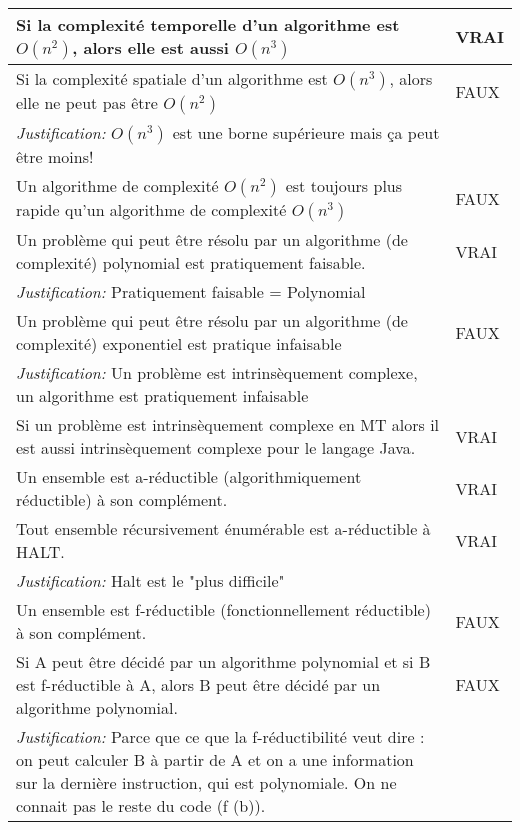\begin{longtable}{p{13cm}|l}
    Si la complexité temporelle d'un algorithme est $O(n^{2})$, alors elle est aussi $O(n^{3})$ & VRAI \\
    \hline
    Si la complexité spatiale d'un algorithme est $O(n^{3})$, alors elle ne peut pas être $O(n^{2})$  & FAUX \\
 	    \textit{Justification:} $O(n^{3})$ est une borne supérieure mais ça peut être moins!   \\
    \hline
    Un algorithme de complexité $O(n^{2})$ est toujours plus rapide qu'un algorithme de complexité $O(n^{3})$ & FAUX \\
    \hline
    Un problème qui peut être résolu par un algorithme (de complexité) polynomial est pratiquement faisable. & VRAI \\
        \textit{Justification:} Pratiquement faisable = Polynomial \\
    \hline
    Un problème qui peut être résolu par un algorithme (de complexité) exponentiel est pratique infaisable & FAUX \\
       \textit{Justification:} Un problème est intrinsèquement complexe, un algorithme est pratiquement infaisable \\
    \hline
    Si un problème est intrinsèquement complexe en MT alors il est aussi intrinsèquement complexe pour le langage Java.& VRAI\\
    \hline
    Un ensemble est a-réductible (algorithmiquement réductible) à son complément.& VRAI\\
    \hline
    Tout ensemble récursivement énumérable est a-réductible à HALT. & VRAI\\
      \textit{Justification:} Halt est le "plus difficile" \\
    \hline
    Un ensemble est f-réductible (fonctionnellement réductible) à son complément. & FAUX \\
    \hline
    Si A peut être décidé par un algorithme polynomial et si B est f-réductible à A, alors B peut être décidé par un algorithme polynomial. & FAUX \\
    \textit{Justification:} Parce que ce que la f-réductibilité veut dire : on peut calculer B à partir de A et on a une information sur la dernière instruction, qui est polynomiale. On ne connait pas le reste du code (f (b)). &\\
\end{longtable}
